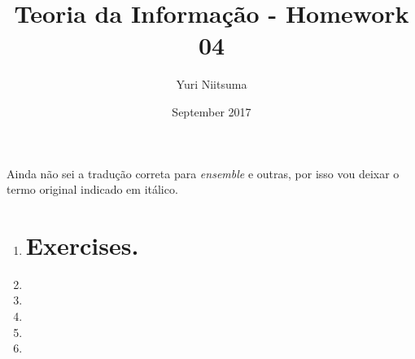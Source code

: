 \documentclass{IEEEtran}
\title{Teoria da Informação - Homework 04}
\author{Yuri Niitsuma}
\date{September 2017}
\begin{document}
\maketitle

Ainda não sei a tradução correta para \textit{ensemble} e outras, por isso vou deixar o termo original indicado em itálico.

\begin{enumerate}
\itemsep1em
	\section*{Review questions.}

	\item
	
	
	\newpage

	\section*{Exercises.}

	\item 
	
	\item 
	
	\item 
	
	\item 
	
	\item 
	

\end{enumerate}
\end{document}
